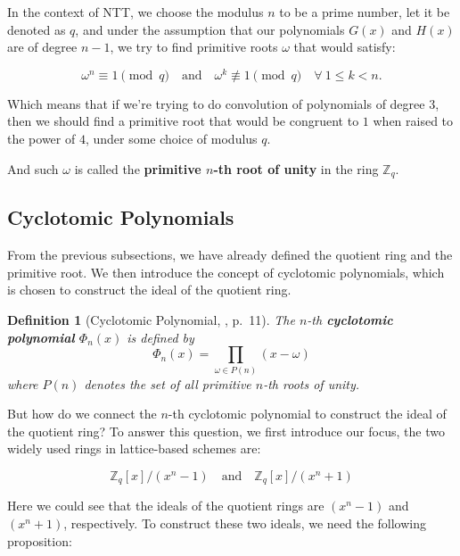 \documentclass[12pt]{article}
\newtheorem{definition}{Definition}[section]
\begin{document}
In the context of NTT, we choose the modulus $n$ to be a prime number, let it be denoted as $q$, 
and under the assumption that our polynomials $G(x)$ and $H(x)$ are of degree $n-1$, 
we try to find primitive roots $\omega$ that would satisfy:

\begin{equation*}
    \omega^n \equiv 1 \pmod{q} \quad \text{and} \quad \omega^k \not\equiv 1 \pmod{q} \quad \forall \ 1 \leq k < n.
\end{equation*}

Which means that if we're trying to do convolution of polynomials of degree $3$, 
then we should find a primitive root that would be congruent to $1$ when raised to the power of $4$, 
under some choice of modulus $q$.

And such $\omega$ is called the \textbf{primitive $n$-th root of unity} in the ring $\mathbb{Z}_q$.
\cite[p.~4]{beginner_guide}

\subsection{Cyclotomic Polynomials}

From the previous subsections, we have already defined the quotient ring and the primitive root.
We then introduce the concept of cyclotomic polynomials, 
which is chosen to construct the ideal of the quotient ring.
\cite[p.~3]{survey}

\begin{definition}[Cyclotomic Polynomial, \cite{cyclotomic}, p.~11]
    The $n$-th \textbf{cyclotomic polynomial} $\Phi_n(x)$ is defined by
    \begin{equation*}
        \Phi_n(x) = \prod_{\omega \in P(n)} (x - \omega)
    \end{equation*}
    where $P(n)$ denotes the set of all primitive $n$-th roots of unity.
\end{definition}

But how do we connect the $n$-th cyclotomic polynomial to construct the ideal of the quotient ring?
To answer this question, we first introduce our focus, 
the two widely used rings in lattice-based schemes are:

\begin{equation*}
    \mathbb{Z}_q[x] / (x^n - 1) \quad \text{and} \quad \mathbb{Z}_q[x] / (x^n + 1)
\end{equation*}
\cite[p.~3]{survey}

Here we could see that the ideals of the quotient rings are $(x^n - 1)$ and $(x^n + 1)$, respectively.
To construct these two ideals, we need the following proposition:
\end{document}
